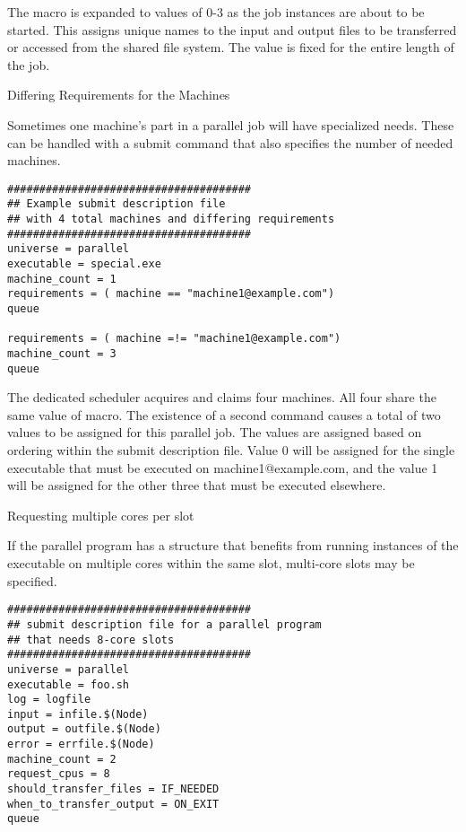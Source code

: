 The  macro is expanded to values of 0-3
as the job instances are about to be started.
This assigns unique names to the input and output files
to be transferred or accessed from the shared file system.
The  value is fixed for the entire length of the job.

\begin{description}
\item[Differing Requirements for the Machines]
\end{description}

Sometimes one machine's part in a parallel job will have specialized needs.
These can be handled with a  submit command
that also specifies the number of needed  machines. 

\footnotesize
\begin{verbatim}
######################################
## Example submit description file
## with 4 total machines and differing requirements
######################################
universe = parallel
executable = special.exe
machine_count = 1
requirements = ( machine == "machine1@example.com")
queue

requirements = ( machine =!= "machine1@example.com")
machine_count = 3
queue
\end{verbatim}
\normalsize

The dedicated scheduler acquires and claims four machines.
All four share the same value of  macro.
The existence of a second  command causes a total of two
 values to be assigned for this parallel job.
The  values are assigned based on ordering
within the submit description file. 
Value 0 will be assigned for the single executable
that must be executed on machine1@example.com, and
the value 1 will be assigned for the other three 
that must be executed elsewhere.

\begin{description}
\item[Requesting multiple cores per slot]
\end{description}

If the parallel program has a structure that benefits from
running instances of the executable on multiple cores within the same slot,
multi-core slots may be specified.

\footnotesize
\begin{verbatim}
######################################
## submit description file for a parallel program
## that needs 8-core slots
######################################
universe = parallel
executable = foo.sh
log = logfile
input = infile.$(Node)
output = outfile.$(Node)
error = errfile.$(Node)
machine_count = 2
request_cpus = 8
should_transfer_files = IF_NEEDED
when_to_transfer_output = ON_EXIT
queue
\end{verbatim}
\normalsize

